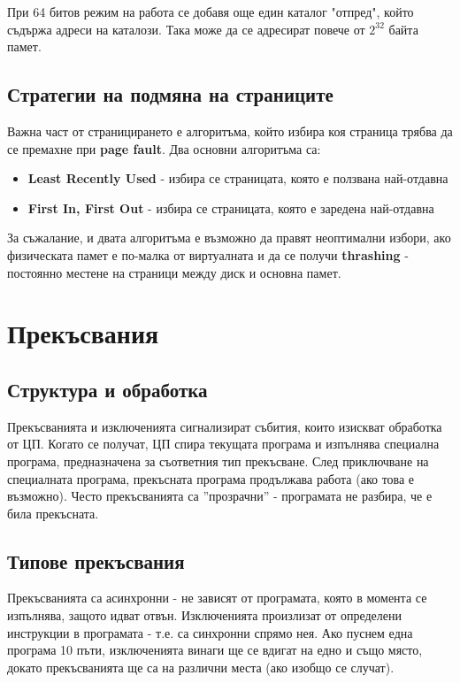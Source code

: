 \documentclass[fleqn,12pt]{article}
\begin{document}
При 64 битов режим на работа се добавя още един каталог "отпред", който съдържа адреси на каталози. Така може да се адресират 
повече от $2^{32}$ байта памет.

\subsection{Стратегии на подмяна на страниците}
Важна част от страницирането е алгоритъма, който избира коя страница трябва да се премахне при \textbf{page fault}.
Два основни алгоритъма са:
\begin{itemize}
    \item \textbf{Least Recently Used} - избира се страницата, която е ползвана най-отдавна
    \item \textbf{First In, First Out} - избира се страницата, която е заредена най-отдавна
\end{itemize}

За съжалание, и двата алгоритъма е възможно да правят неоптимални избори, ако физическата памет е по-малка от виртуалната 
и да се получи \textbf{thrashing} - постоянно местене на страници между диск и основна памет.

\section{Прекъсвания}

\subsection{Структура и обработка}
Прекъсванията и изключенията сигнализират събития, които изискват обработка от ЦП. Когато се получат,
ЦП спира текущата програма и изпълнява специална програма, предназначена за съответния тип прекъсване.
След приключване на специалната програма, прекъсната програма продължава работа (ако това е възможно).
Често прекъсванията са ''прозрачни'' - програмата не разбира, че е била прекъсната.

\subsection{Типове прекъсвания}
Прекъсванията са асинхронни - не зависят от програмата, която в момента се изпълнява, защото идват отвън.
Изключенията произлизат от определени инструкции в програмата - т.е. са синхронни спрямо нея.
Ако пуснем една програма 10 пъти, изключенията винаги ще се вдигат на едно и също място, докато прекъсванията
ще са на различни места (ако изобщо се случат).
\end{document}
